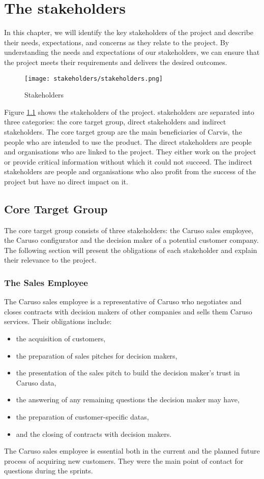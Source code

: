 \chapter{The \Glspl{stakeholder}}
In this chapter, we will identify the key \glspl{stakeholder} of the project and describe their needs, expectations, and concerns as they relate to the project. By understanding the needs and expectations of our \glspl{stakeholder}, we can ensure that the project meets their requirements and delivers the desired outcomes.
\begin{figure}[ht]
  \centering
  \texttt{[image: stakeholders/stakeholders.png]}
  \caption{Stakeholders}
  \label{Kap2:Stakeholders}
\end{figure}
Figure \ref{Kap2:Stakeholders} shows the \glspl{stakeholder} of the project. \Glspl{stakeholder} are separated into three categories: the core target group, direct \glspl{stakeholder} and indirect \glspl{stakeholder}. The core target group are the main beneficiaries of Carvis, the people who are intended to use the product. The direct \glspl{stakeholder} are people and organisations who are linked to the project. They either work on the project or provide critical information without which it could not succeed. The indirect \glspl{stakeholder} are people and organisations who also profit from the success of the project but have no direct impact on it.

\section{Core Target Group}
The core target group consists of three \glspl{stakeholder}: the Caruso sales employee, the Caruso configurator and the decision maker of a potential customer company. The following section will present the obligations of each \gls{stakeholder} and explain their relevance to the project.

\subsection{The Sales Employee}
The Caruso sales employee is a representative of Caruso who negotiates and closes contracts with decision makers of other companies and sells them Caruso services. Their obligations include:
\begin{itemize}
  \item the acquisition of customers,
  \item the preparation of sales pitches for decision makers,
  \item the presentation of the sales pitch to build the decision maker's trust in Caruso data,
  \item the answering of any remaining questions the decision maker may have,
  \item the preparation of customer-specific \glspl{data},
  \item and the closing of contracts with decision makers.
\end{itemize}
The Caruso sales employee is essential both in the current and the planned future process of acquiring new customers. They were the main point of contact for questions during the \glspl{sprint}.

